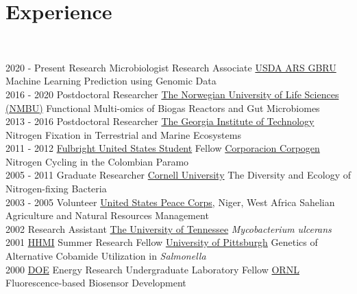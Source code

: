 \documentclass[letterpaper]{twentysecondcv3} %
\begin{document}
\section{Experience}\\
\begin{twenty} %
\twentyitem
    	{2020 -}
		{Present}
        {Research Microbiologist Research Associate}
        {\href{https://www.ars.usda.gov/southeast-area/stoneville-ms/genomics-and-bioinformatics-research/}{USDA ARS GBRU}}
        {Machine Learning Prediction using Genomic Data}\\

    \twentyitem
    	{2016 -}
		{2020}
        {Postdoctoral Researcher}
        {\href{https://www.nmbu.no/}{The Norwegian University of Life Sciences (NMBU)}}
        {Functional Multi-omics of Biogas Reactors and Gut Microbiomes}\\

    \twentyitem
   	{2013 -}
		{2016}
        {Postdoctoral Researcher}
        {\href{https://www.gatech.edu/}{The Georgia Institute of Technology}}
        {Nitrogen Fixation in Terrestrial and Marine Ecosystems}\\

    \twentyitem
   	{2011 -}
		{2012}
        {\href{https://us.fulbrightonline.org/}{Fulbright United States Student} Fellow}
        {\href{https://www.corpogen.org/}{Corporacion Corpogen}}
        {Nitrogen Cycling in the Colombian Paramo}\\

    \twentyitem
   	{2005 -}
		{2011}
        {Graduate Researcher}
        {\href{https://www.cornell.edu/}{Cornell University}}
        {The Diversity and Ecology of Nitrogen-fixing Bacteria}\\

    \twentyitem
   	{2003 -}
		{2005}
        {Volunteer}
        {\href{https://www.peacecorps.gov/}{United States Peace Corps}, Niger, West Africa}
        {Sahelian Agriculture and Natural Resources Management}\\

    \twentyitem
   	{2002}
		{}
        {Research Assistant}
        {\href{https://www.utk.edu/}{The University of Tennessee}}
        {\textit{Mycobacterium ulcerans}}\\

    \twentyitem
   	{2001}
		{}
        {\href{https://www.hhmi.org/}{HHMI} Summer Research Fellow}
        {\href{https://www.pitt.edu/}{University of Pittsburgh}}
        {Genetics of Alternative Cobamide Utilization in \textit{Salmonella}}\\

    \twentyitem
        {2000}
		{}
        {\href{https://www.energy.gov/}{DOE} Energy Research Undergraduate Laboratory Fellow}
        {\href{https://www.ornl.gov/}{ORNL}}
        {Fluorescence-based Biosensor Development}

\end{twenty}
\end{document}
